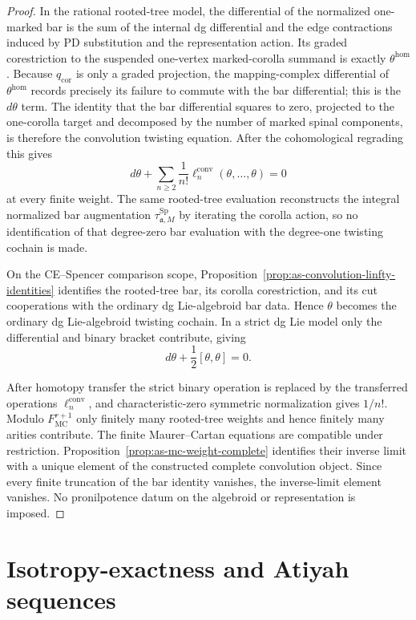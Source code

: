 \begin{proof}
In the rational rooted-tree model, the differential of the normalized
one-marked bar is the sum of the internal dg differential and the edge
contractions induced by PD substitution and the representation action.  Its graded corestriction to the suspended one-vertex marked-corolla summand
is exactly $\theta^{\mathrm{hom}}$.  Because $q_{\mathrm{cor}}$ is only a
graded projection, the mapping-complex differential of
$\theta^{\mathrm{hom}}$ records precisely its failure to commute with the bar
differential; this is the $d\theta$ term.  The identity that the bar
differential squares to zero, projected to the one-corolla target and
decomposed by the number of marked spinal components, is therefore the
convolution twisting equation.
After the cohomological regrading this gives
\[
    d\theta+
    \sum_{n\ge2}\frac1{n!}
    \ell_n^{\mathrm{conv}}(\theta,\ldots,\theta)=0
\]
at every finite weight.  The same rooted-tree evaluation reconstructs the
integral normalized bar augmentation
$\tau_{\mathfrak a,M}^{\mathrm{Sp}}$ by iterating the corolla action, so no
identification of that degree-zero bar evaluation with the degree-one twisting
cochain is made.

On the CE--Spencer comparison scope,
Proposition~\ref{prop:as-convolution-linfty-identities} identifies the
rooted-tree bar, its corolla corestriction, and its cut cooperations with the
ordinary dg Lie-algebroid bar data.  Hence $\theta$ becomes the ordinary dg
Lie-algebroid twisting cochain.  In a strict dg Lie model only the differential
and binary bracket contribute, giving
\[
    d\theta+\frac12[\theta,\theta]=0.
\]

After homotopy transfer the strict binary operation is replaced by the
transferred operations $\ell_n^{\mathrm{conv}}$, and characteristic-zero
symmetric normalization gives $1/n!$.  Modulo
$F_{\mathrm{MC}}^{r+1}$ only finitely many rooted-tree weights and hence
finitely many arities contribute.  The finite Maurer--Cartan equations are
compatible under restriction.  Proposition~\ref{prop:as-mc-weight-complete}
identifies their inverse limit with a unique element of the constructed
complete convolution object.  Since every finite truncation of the bar
identity vanishes, the inverse-limit element vanishes.  No pronilpotence datum
on the algebroid or representation is imposed.
\end{proof}

\section{Isotropy-exactness and Atiyah sequences}
\label{sec:as-isotropy-exactness}

